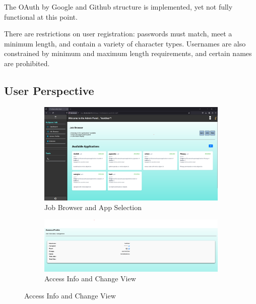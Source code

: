 The OAuth by Google and Github structure is implemented, yet not fully functional at this point.

There are restrictions on user registration: passwords must match, meet a minimum length, and contain a variety of character types.
Usernames are also constrained by minimum and maximum length requirements, and certain names are prohibited.
\newpage

\subsection{User Perspective}

\begin{figure}[!htbp]
    \centering
    \begin{subfigure}[b]{0.48\textwidth}
        \includegraphics[width=\textwidth]{Images/kuspace_user_jobBrowser_apps.png}
        \caption{Job Browser and App Selection}
        \label{fig:jobbrowserapps}
    \end{subfigure}
    \hfill
    \begin{subfigure}[b]{0.48\textwidth}
        \includegraphics[width=\textwidth]{Images/kuspace_user_accessInfo_change.png}
        \caption{Access Info and Change View}
        \label{fig:accessinfochange}
    \end{subfigure}

    \vspace{1em}


\end{figure}

